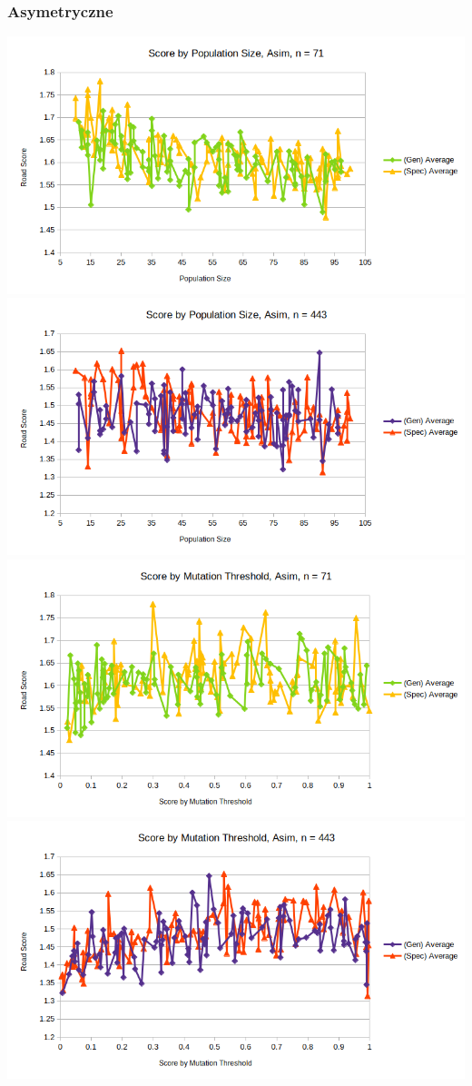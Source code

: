 \documentclass{article}
\begin{document}
\subsubsection*{Asymetryczne}
\includegraphics[scale=0.36]{pSAsim71}
\includegraphics[scale=0.36]{pSAsim443}
\includegraphics[scale=0.36]{mTAsim71}
\includegraphics[scale=0.36]{mTAsim443}
\end{document}
